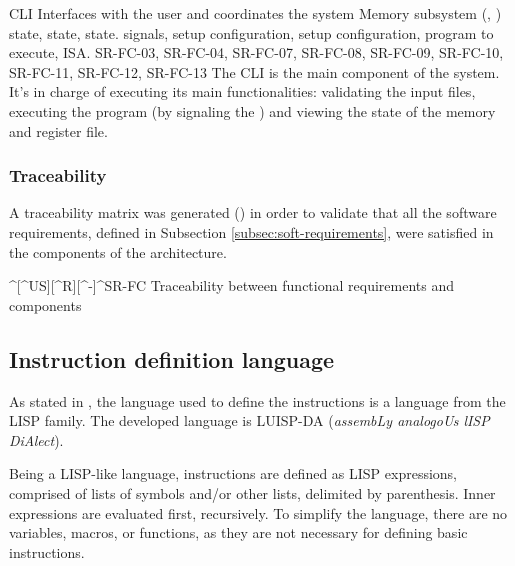 \begin{component}{CLI}
  {Interfaces with the user and coordinates the system}  %
  {Memory subsystem (, )}  %
  { state,  state,  state.}  %
  { signals,  setup configuration,  setup configuration, program to execute, \gls{ISA}.}  %
  {SR-FC-03, SR-FC-04, SR-FC-07, SR-FC-08, SR-FC-09, SR-FC-10, SR-FC-11, SR-FC-12, SR-FC-13}  %
  The \gls{CLI} is the main component of the system. It's in charge of executing its main functionalities: validating the input files, executing the program (by signaling the ) and viewing the state of the memory and register file.
\end{component}

\FloatBarrier


\subsubsection{Traceability}\label{subsec:comp-traceability}
A traceability matrix was generated () in order to validate that all the software requirements, defined in Subsection \ref{subsec:soft-requirements}, were satisfied in the components of the architecture.

  {^[^US][^R][^-]}{^SR-FC}
  {Traceability between functional requirements and components}

\FloatBarrier


\subsection{Instruction definition language}\label{subsec:inst-lang-design}
As stated in , the language used to define the instructions is a language from the LISP family. The developed language is LUISP-DA (\textit{assembLy analogoUs lISP DiAlect}).

Being a LISP-like language, instructions are defined as LISP expressions, comprised of lists of symbols and/or other lists, delimited by parenthesis. Inner expressions are evaluated first, recursively. To simplify the language, there are no variables, macros, or functions, as they are not necessary for defining basic instructions.

